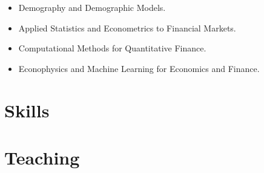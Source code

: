 \documentclass[10pt,a4paper,]{twentysecondcv}
\providecommand{\tightlist}{%
  \setlength{\itemsep}{0pt}\setlength{\parskip}{0pt}}
\begin{document}
\begin{itemize}
\tightlist
\item
  Demography and Demographic Models.
\item
  Applied Statistics and Econometrics to Financial Markets.
\item
  Computational Methods for Quantitative Finance.
\item
  Econophysics and Machine Learning for Economics and Finance.
\end{itemize}

\hypertarget{skills}{%
\section{Skills}\label{skills}}

\nopagebreak

\begin{twentyshort}
\end{twentyshort}

\hypertarget{Teaching}{%
\section{Teaching}\label{teaching}}
\end{document}
